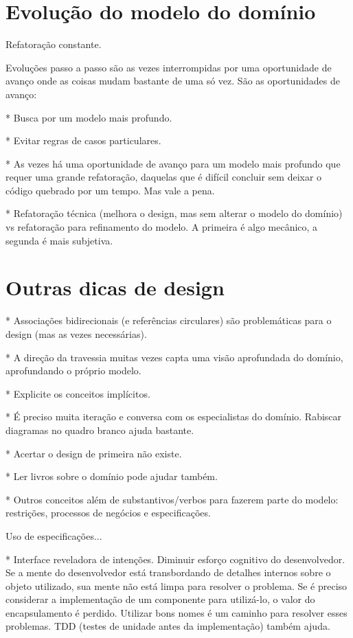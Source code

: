 \documentclass[a4paper, 12pt]{article}
\begin{document}
\section{Evolução do modelo do domínio}

Refatoração constante.

Evoluções passo a passo são as vezes interrompidas por uma oportunidade de avanço onde as coisas mudam bastante de uma só vez. São as oportunidades de avanço: 

* Busca por um modelo mais profundo.

* Evitar regras de casos particulares.

* As vezes há uma oportunidade de avanço para um modelo mais profundo que requer uma grande refatoração, daquelas que é difícil concluir sem deixar o código quebrado por um tempo. Mas vale a pena.

* Refatoração técnica (melhora o design, mas sem alterar o modelo do domínio) vs refatoração para refinamento do modelo. A primeira é algo mecânico, a segunda é mais subjetiva.



\section{Outras dicas de design}

* Associações bidirecionais (e referências circulares) são problemáticas para o design (mas as vezes necessárias).

* A direção da travessia muitas vezes capta uma visão aprofundada do domínio, aprofundando o próprio modelo. 

* Explicite os conceitos implícitos.

* É preciso muita iteração e conversa com os especialistas do domínio. Rabiscar diagramas no quadro branco ajuda bastante. 

* Acertar o design de primeira não existe.

* Ler livros sobre o domínio pode ajudar também.

* Outros conceitos além de substantivos/verbos para fazerem parte do modelo: restrições, processos de negócios e especificações.

Uso de especificações...

* Interface reveladora de intenções. Diminuir esforço cognitivo do desenvolvedor. Se a mente do desenvolvedor está transbordando de detalhes internos sobre o objeto utilizado, sua mente não está limpa para resolver o problema. Se é preciso considerar a implementação de um componente para utilizá-lo, o valor do encapsulamento é perdido. Utilizar bons nomes é um caminho para resolver esses problemas. TDD (testes de unidade antes da implementação) também ajuda.
\end{document}
